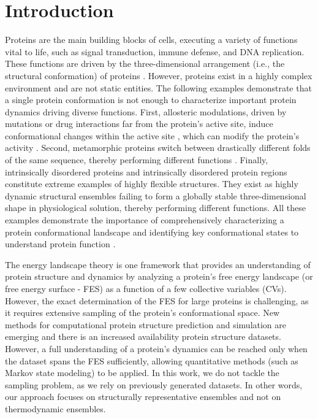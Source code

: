 \documentclass[numsec,webpdf,contemporary,large]{oup-authoring-template}
\theoremstyle{thmstyleone}%
\theoremstyle{thmstyletwo}%
\theoremstyle{thmstylethree}%
\begin{document}
\maketitle
\section{Introduction}

Proteins are the main building blocks of cells, executing a variety of functions vital to life, such as signal transduction, immune defense, and DNA replication. These functions are driven by the three-dimensional arrangement (i.e., the structural conformation) of proteins \citep{kessel__2018}. However, proteins exist in a highly complex environment and are not static entities. The following examples demonstrate that a single protein conformation is not enough to characterize important protein dynamics driving diverse functions. First, allosteric modulations, driven by mutations or drug interactions far from the protein's active site, induce conformational changes within the active site \citep{nussinov_allostery_2013}, which can modify the protein’s activity \citep{todd_plasticity_2002, tsou_active_1998, weng_study_2011}. Second, metamorphic proteins \citep{dishman_unfolding_2018, dishman_design_2022, lella_metamorphic_2017} switch between drastically different folds of the same sequence, thereby performing different functions \citep{kim_functional_2021}. Finally, intrinsically disordered proteins and intrinsically disordered protein regions constitute extreme examples of highly flexible structures. They exist as highly dynamic structural ensembles \citep{uversky_p53_2016} failing to form a globally stable three-dimensional shape in physiological solution, thereby performing different functions. All these examples demonstrate the importance of comprehensively characterizing a protein conformational landscape and identifying key conformational states to understand protein function \citep{henzler-wildman_dynamic_2007}. 

The energy landscape theory \citep{frauenfelder_energy_1991, kumar_folding_2000, onuchic_theory_1997} is one framework that provides an understanding of protein structure and dynamics by analyzing a protein’s free energy landscape (or free energy surface - FES) as a function of a few collective variables (CVs). However, the exact determination of the FES for large proteins is challenging, as it requires extensive sampling of the protein's conformational space. New methods for computational protein structure prediction \citep{jumper_highly_2021, baek_accurate_2021, lin_evolutionary-scale_2022} and simulation \citep{barhaghi_py-mcmd_2022, abraham_gromacs_2015, eastman_openmm_2013, husic_coarse_2020, henin_enhanced_2022} are emerging and there is an increased availability protein structure datasets. However, a full understanding of a protein's dynamics can be reached only when the dataset spans the FES sufficiently, allowing quantitative methods (such as Markov state modeling) to be applied. In this work, we do not tackle the sampling problem, as we rely on previously generated datasets. In other words, our approach focuses on structurally representative ensembles and not on thermodynamic ensembles. 
\end{document}
